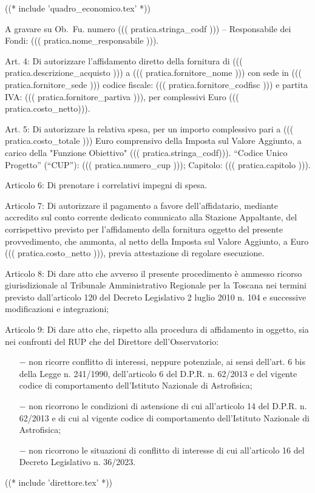 \documentclass[a4paper,12pt]{letter}
\begin{document}
((* include 'quadro_economico.tex' *))

A gravare su Ob.~Fu. numero ((( pratica.stringa_codf ))) – Responsabile dei
Fondi: ((( pratica.nome_responsabile ))).

Art. 4: Di autorizzare l’affidamento diretto della fornitura di ((( pratica.descrizione_acquisto ))) a
((( pratica.fornitore_nome ))) con sede in  ((( pratica.fornitore_sede )))
codice fiscale: ((( pratica.fornitore_codfisc ))) e partita IVA:
((( pratica.fornitore_partiva ))), per complessivi Euro ((( pratica.costo_netto))).

Art. 5: Di autorizzare la relativa spesa, per un importo complessivo
pari a ((( pratica.costo_totale ))) Euro comprensivo della Imposta sul
Valore Aggiunto, a carico della "Funzione Obiettivo" ((( pratica.stringa_codf))).
``Codice Unico Progetto'' (``CUP''): ((( pratica.numero_cup )));  Capitolo:
((( pratica.capitolo ))).

Articolo 6: Di prenotare i correlativi impegni di spesa.

Articolo 7: Di autorizzare il pagamento a favore dell’affidatario,
mediante accredito sul conto corrente dedicato comunicato alla Stazione
Appaltante, del corrispettivo previsto per l’affidamento della
fornitura oggetto del presente provvedimento, che ammonta, al netto
della Imposta sul Valore Aggiunto, a Euro ((( pratica.costo_netto ))),
previa attestazione di regolare esecuzione.

Articolo 8: Di dare atto che avverso il presente procedimento è ammesso
ricorso giurisdizionale al Tribunale Amministrativo Regionale per la
Toscana nei termini previsto dall’articolo 120 del Decreto Legislativo
2 luglio 2010 n. 104 e successive modificazioni e integrazioni;

Articolo 9: Di dare atto che, rispetto alla procedura di affidamento in
oggetto, sia nei confronti del RUP che del Direttore dell’Osservatorio:

\begin{itemize}

\item[$-$]  non ricorre conflitto di interessi, neppure potenziale, ai
sensi dell’art. 6 bis della Legge n. 241/1990, dell’articolo 6 del
D.P.R. n. 62/2013 e del vigente codice di comportamento dell’Istituto
Nazionale di Astrofisica;

\item[$-$]  non ricorrono le condizioni di astensione di cui
all’articolo 14 del D.P.R. n. 62/2013 e di cui al vigente codice di
comportamento dell’Istituto Nazionale di Astrofisica;

\item[$-$] non ricorrono le situazioni di conflitto di interesse di cui
all’articolo 16 del Decreto Legislativo n. 36/2023.

\end{itemize}

((* include 'direttore.tex' *))
\end{document}

